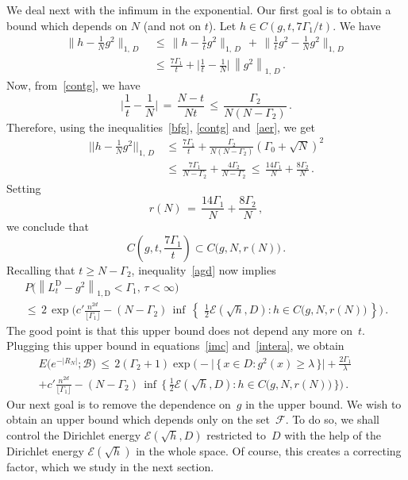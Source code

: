 \documentclass[10pt]{amsart}
\theoremstyle{definition}\newtheorem{defi}[theo]{Definition}\newtheorem{rema}[theo]{Remark}\newtheorem{exam}[theo]{Example}\newtheorem{exem}[theo]{Example}\newtheorem{nota}[theo]{Notation}
\newcommand*\tD{\mathrm{D}}%
\newcommand{\cB}{\mathcal{B}}
\newcommand{\cE}{\mathcal{E}}
\newcommand{\cF}{\mathcal{F}}
\begin{document}
We deal next with the infimum in the exponential. Our first goal is to obtain a bound which depends on $N$ (and not on $t$). Let $h\in C(g,t, {7\Gamma_1}/{t})$. We have
\begin{align*}
\Big\|h-\frac{1}{N}g^2\Big\|_{1,\,D}
\,&\leq\,
\Big\|h-\frac{1}{t}g^2\Big\|_{1,\,D}\,+\,
\Big\| \frac{1}{t}g^2-
\frac{1}{N}g^2\Big\|_{1,\,D}
\\
\,&\leq\,
\frac{7\Gamma_1}{t}+
\Big| \frac{1}{t}-
\frac{1}{N}\Big|\,\left\|g^2\right\|_{1,\,D}\,.
\end{align*}
Now, from~\eqref{contg}, we have
\[
\Big| \frac{1}{t}-
\frac{1}{N}\Big|\,=\,
\frac{N-t}{Nt}
\,\leq\,
\frac{\Gamma_2}{N(N-\Gamma_2)}\,.
\]
Therefore, using the inequalities~\eqref{bfg}, \eqref{contg} and~\eqref{aer}, we get
\begin{equation}\label{nbv}
\begin{aligned}
\Big|\Big|h-\frac{1}{N}g^2\Big|\Big|_{1,\,D} &\,\leq\,
\frac{7\Gamma_1}{t}+
\frac{\Gamma_2}{N(N-\Gamma_2)} \left(\Gamma_0+ \sqrt{N}\right)^2\\ &\,\leq\,
\frac{7\Gamma_1}{N-\Gamma_2}+
\frac{4\Gamma_2}{N-\Gamma_2}
\,\leq\,
\frac{14\Gamma_1}{N}+
\frac{8\Gamma_2}{N}
\,.
\end{aligned}
\end{equation}
Setting
\[
r(N)\,=\,
\frac{14\Gamma_1}{N}+
\frac{8\Gamma_2}{N}\,,
\]
we conclude that
\[
C\left(g,t, \frac{7\Gamma_1}{t}\right)
\subset C\big(g,N, r(N)\big)
\,.
\]
Recalling that $t\geq N-\Gamma_2$, inequality~\eqref{agd} now implies
\begin{multline*}
P\big(\left\|L_t^{\tD}-g^2\right\|_{1,\tD}<\Gamma_1,\,\tau<\infty
\big)\\ \leq\,2 \, \exp\Big(c'\frac{n^{2d}}{\lfloor\Gamma_1\rfloor} -(N-\Gamma_2)\,\inf\,\left\{\,
\,\frac{1}{2}\cE(\sqrt{h},D) :h\in C\big(g,N, r(N)\big)
\,\right\} \Big) \,.
\end{multline*}
The good point is that this upper bound does not depend any more on~$t$. Plugging this upper bound in equations~\eqref{imc} and~\eqref{intera}, we obtain
\begin{multline}\label{zbv}
E\big(e^{-|R_N|};\cB \big)
\,\leq\, 2(\Gamma_2+1)
\exp\Big(-
\big|\,\big\{\,x\in D:g^2(x)\geq\lambda\,\big\}\big| +\frac{2\Gamma_1}{\lambda}
\qquad
\\ + c'\frac{n^{2d}}{\lfloor\Gamma_1\rfloor} -(N-\Gamma_2)\,\inf\,\Big\{\,\frac{1}{2}\cE(\sqrt{h},D): h\in C\big(g,N, r(N)\big)
\,\Big\}\Big)
\,.\qquad
\end{multline}
Our next goal is to remove the dependence on~$g$ in the upper bound. We wish to obtain an upper bound which depends only on the set~$\cF$. To do so, we shall control the Dirichlet energy $\cE(\sqrt{h},D)$ restricted to~$D$ with the help of the Dirichlet energy $\cE(\sqrt{h})$ in the whole space. Of course, this creates a correcting factor, which we study in the next section.
\end{document}
